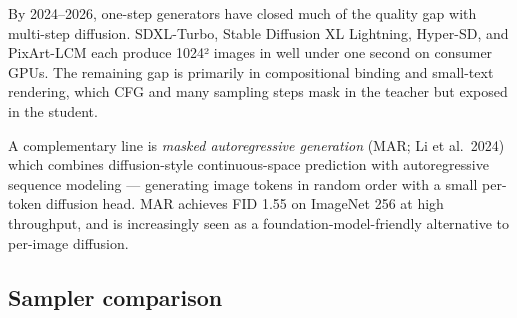 By 2024--2026, one-step generators have closed much of the quality gap with multi-step diffusion. SDXL-Turbo, Stable Diffusion XL Lightning, Hyper-SD, and PixArt-LCM each produce 1024² images in well under one second on consumer GPUs. The remaining gap is primarily in compositional binding and small-text rendering, which CFG and many sampling steps mask in the teacher but exposed in the student.

A complementary line is \emph{masked autoregressive generation} (MAR; Li et al.~2024) which combines diffusion-style continuous-space prediction with autoregressive sequence modeling --- generating image tokens in random order with a small per-token diffusion head. MAR achieves FID 1.55 on ImageNet 256 at high throughput, and is increasingly seen as a foundation-model-friendly alternative to per-image diffusion.

\subsection{Sampler comparison}\label{sampler-comparison}


